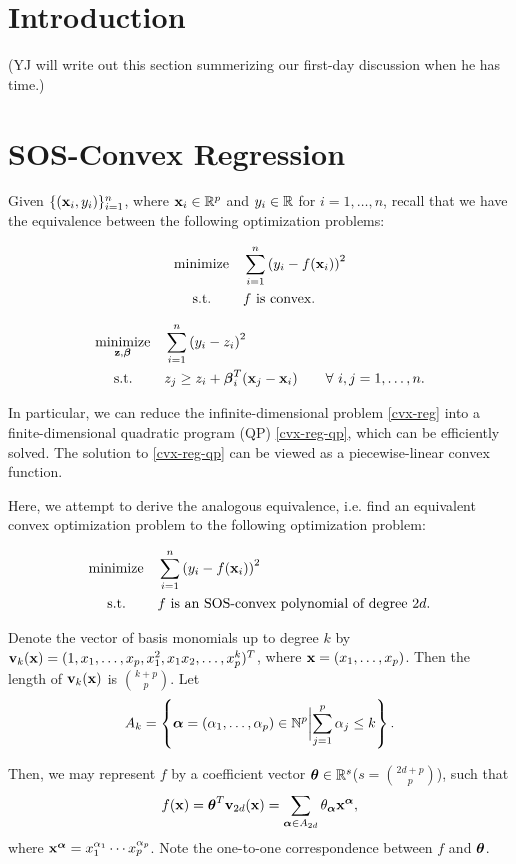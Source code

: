 \documentclass[11pt]{article}
\newcommand{\optprob}[5]
{
	\begin{equation}\label{#5}
	\begin{aligned}
	& \underset{#2}{\text{#1}}
	& & #3 \\
	& \text{\quad\ s.t.}
	& & #4
	\end{aligned}
	\end{equation}
}
\begin{document}

\section{Introduction}

(YJ will write out this section summerizing our first-day discussion when he has time.)

\clearpage

\section{SOS-Convex Regression}

Given $\{({\bf x}_i, y_i)\}_{i=1}^n$, where ${\bf x}_i \in {\mathbb R}^p$ and $y_i \in {\mathbb R}$ for $i = 1, \dotsc, n$, recall that we have the equivalence between the following optimization problems:

\optprob{minimize}{}{\sum_{i=1}^n\inparen{y_i - f(\bfx_i)}^2}{\text{$f$ is convex.}}{cvx-reg}

\optprob{minimize}{\bfz, \bfbeta}{\sum_{i=1}^n\inparen{y_i - z_i}^2}{z_j \geq z_i + \bfbeta_i^T(\bfx_j - \bfx_i) \qquad\forall\ i, j = 1, \dotsc, n.}{cvx-reg-qp}

In particular, we can reduce the infinite-dimensional problem \eqref{cvx-reg} into a finite-dimensional quadratic program (QP) \eqref{cvx-reg-qp}, which can be efficiently solved. The solution to \eqref{cvx-reg-qp} can be viewed as a piecewise-linear convex function. 

Here, we attempt to derive the analogous equivalence, i.e. find an equivalent convex optimization problem to the following optimization problem:
\optprob{minimize}{}{\sum_{i=1}^n\inparen{y_i - f(\bfx_i)}^2}{\text{$f$ is an SOS-convex polynomial of degree $2d$.}}{sos-reg}

Denote the vector of basis monomials up to degree $k$ by ${\bf v}_k({\bf x}) = (1, x_1, \dotsc, x_p, x_1^2, x_1x_2, \dotsc, x_p^k)^T$, where ${\bf x} = (x_1, \dotsc, x_p)$. Then the length of ${\bf v}_k({\bf x})$ is ${k + p \choose p}$. Let
$$A_k = \left\{ {\boldsymbol\alpha} = (\alpha_1, \dotsc, \alpha_p) \in {\mathbb{N}}^p \biggl| \sum_{j=1}^p \alpha_j \leq k \right\}.$$

Then, we may represent $f$ by a coefficient vector ${\boldsymbol\theta} \in {\mathbb R}^s$($s = {2d + p \choose p}$), such that
\begin{equation} \label{sos-cvx-poly}
f({\bf x}) = {\boldsymbol\theta}^T{\bf v}_{2d}({\bf x}) = \sum_{{\boldsymbol\alpha} \in A_{2d}} \theta_{\boldsymbol\alpha} {\bf x}^{\boldsymbol\alpha},
\end{equation}
where ${\bf x}^{\boldsymbol\alpha} = x_1^{\alpha_1}\cdots x_p^{\alpha_p}$. Note the one-to-one correspondence between $f$ and ${\boldsymbol\theta}$.
\end{document}
